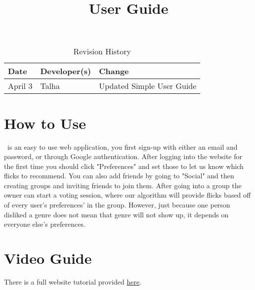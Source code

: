 \documentclass{article}
\title{User Guide\\\progname}
\author{\authname}
\date{}
\begin{document}
\begin{table}[hp]
\caption{Revision History} \label{TblRevisionHistory}
\begin{tabularx}{\textwidth}{llX}
\toprule
\textbf{Date} & \textbf{Developer(s)} & \textbf{Change}\\
\midrule
April 3 & Talha & Updated Simple User Guide\\
\bottomrule
\end{tabularx}
\end{table}

\newpage

\maketitle

\section{How to Use}
\progname ~is an easy to use web application, you first sign-up with either an email and password, or through Google authentication. After logging into the website for the first time you should click "Preferences" and set those to let us know which flicks to recommend. You can also add friends by going to "Social" and then creating groups and inviting friends to join them. After going into a group the owner can start a voting session, where our algorithm will provide flicks based off of every user's preferences' in the group. However, just because one person disliked a genre does not mean that genre will not show up, it depends on everyone else's preferences.

\section{Video Guide}
There is a full website tutorial provided \href{run:./UserGuide.mp4}{here}.
\end{document}
